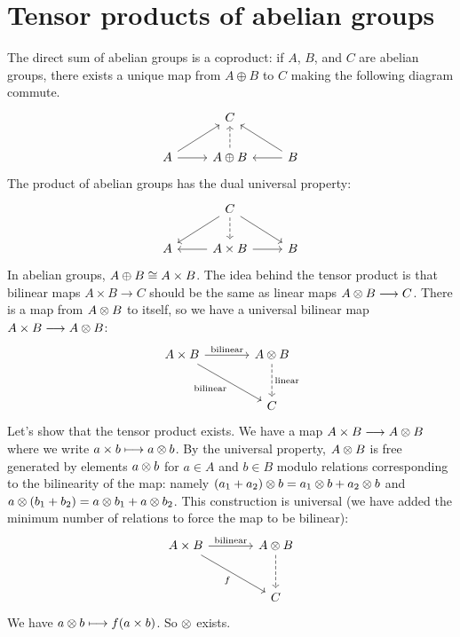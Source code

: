 \documentclass[11pt, oneside,margin=1in]{article}
\begin{document}
\section{Tensor products of abelian groups}
The direct sum of abelian groups is a coproduct: if $A$, $B$, and $C$ are abelian groups, there exists a unique map from $A\oplus B$ to $C$ making the following diagram commute.
\[
	\begin{tikzcd}
		&C&\\
		A \arrow[r] \arrow[ru] & A\oplus B \arrow[u, dashed] & B \arrow[l] \arrow[lu]
	\end{tikzcd}
\]
The product of abelian groups has the dual universal property:
\[
\begin{tikzcd}
	&C\arrow[dl]\arrow[d,dashed]\arrow[dr]&\\
	A & A\times B \arrow[l]\arrow[r] & B
\end{tikzcd}
\]
In abelian groups, $A\oplus B\cong A\times B$. The idea behind the tensor product is that bilinear maps $A\times B\longrightarrow C$ should be the same as linear maps $A\otimes B\longrightarrow C$. There is a map from $A\otimes B$ to itself, so we have a universal bilinear map $A\times B\longrightarrow A\otimes B$:
\[
\begin{tikzcd}[sep=large]
	A\times B \arrow[r, "\textrm{bilinear}"] \arrow[rd, "\textrm{bilinear}", swap] & A\tensor B \arrow[d, "\textrm{linear}",dashed] \\ & C
\end{tikzcd}
\]
Let's show that the tensor product exists. We have a map $A\times B\longrightarrow A\otimes B$ where we write $a\times b \longmapsto a\otimes b$. By the universal property, $A\otimes B$ is free generated by elements $a\otimes b$ for  $a\in A$ and  $b\in B$ modulo relations corresponding to the bilinearity of the map: namely $(a_1+a_2) \otimes b = a_1\otimes b + a_2\otimes b$ and $a \otimes (b_1 + b_2) = a\otimes b_1 + a\otimes b_2$. This construction is universal (we have added the minimum number of relations to force the map to be bilinear):
\[
\begin{tikzcd}
	[sep=large]
        A\times B \arrow[r, "\textrm{bilinear}"] \arrow[rd, "f", swap] & A\tensor B \arrow[d,dashed] \\ & C
\end{tikzcd}
\]
We have $a\otimes b \longmapsto f(a\times b) $. So $\otimes$ exists.\iffalse
\begin{example}[ ]\label{}
Although $\Zmod {91} \tensor \Zmod {119} \ne \{0\}$, we have $\Zmod {91} \tensor \Zmod {120} = \{0\}$.
\end{example}
\fi
\end{document}
